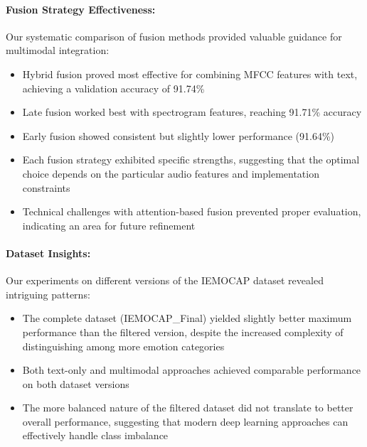 \documentclass[12pt]{article}
\begin{document}
\paragraph{Fusion Strategy Effectiveness:}
Our systematic comparison of fusion methods provided valuable guidance for multimodal integration:
\begin{itemize}
    \item Hybrid fusion proved most effective for combining MFCC features with text, achieving a validation accuracy of 91.74\%
    
    \item Late fusion worked best with spectrogram features, reaching 91.71\% accuracy
    
    \item Early fusion showed consistent but slightly lower performance (91.64\%)
    
    \item Each fusion strategy exhibited specific strengths, suggesting that the optimal choice depends on the particular audio features and implementation constraints
    
    \item Technical challenges with attention-based fusion prevented proper evaluation, indicating an area for future refinement
\end{itemize}

\paragraph{Dataset Insights:}
Our experiments on different versions of the IEMOCAP dataset revealed intriguing patterns:
\begin{itemize}
    \item The complete dataset (IEMOCAP\_Final) yielded slightly better maximum performance than the filtered version, despite the increased complexity of distinguishing among more emotion categories
    
    \item Both text-only and multimodal approaches achieved comparable performance on both dataset versions
    
    \item The more balanced nature of the filtered dataset did not translate to better overall performance, suggesting that modern deep learning approaches can effectively handle class imbalance
\end{itemize}
\end{document}
